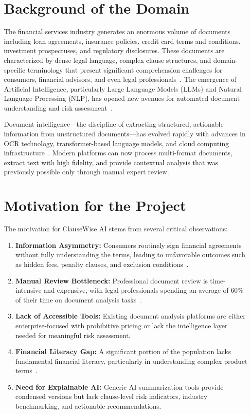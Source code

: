 \documentclass[12pt,a4paper,oneside]{report}
\begin{document}
\section{Background of the Domain}

The financial services industry generates an enormous volume of documents including loan agreements, insurance policies, credit card terms and conditions, investment prospectuses, and regulatory disclosures. These documents are characterized by dense legal language, complex clause structures, and domain-specific terminology that present significant comprehension challenges for consumers, financial advisors, and even legal professionals~\cite{ref1}. The emergence of Artificial Intelligence, particularly Large Language Models (LLMs) and Natural Language Processing (NLP), has opened new avenues for automated document understanding and risk assessment~\cite{ref2}.

Document intelligence---the discipline of extracting structured, actionable information from unstructured documents---has evolved rapidly with advances in OCR technology, transformer-based language models, and cloud computing infrastructure~\cite{ref3}. Modern platforms can now process multi-format documents, extract text with high fidelity, and provide contextual analysis that was previously possible only through manual expert review.

\section{Motivation for the Project}

The motivation for ClauseWise AI stems from several critical observations:

\begin{enumerate}[leftmargin=2cm]
  \item \textbf{Information Asymmetry:} Consumers routinely sign financial agreements without fully understanding the terms, leading to unfavorable outcomes such as hidden fees, penalty clauses, and exclusion conditions~\cite{ref4}.
  \item \textbf{Manual Review Bottleneck:} Professional document review is time-intensive and expensive, with legal professionals spending an average of 60\% of their time on document analysis tasks~\cite{ref5}.
  \item \textbf{Lack of Accessible Tools:} Existing document analysis platforms are either enterprise-focused with prohibitive pricing or lack the intelligence layer needed for meaningful risk assessment.
  \item \textbf{Financial Literacy Gap:} A significant portion of the population lacks fundamental financial literacy, particularly in understanding complex product terms~\cite{ref6}.
  \item \textbf{Need for Explainable AI:} Generic AI summarization tools provide condensed versions but lack clause-level risk indicators, industry benchmarking, and actionable recommendations.
\end{enumerate}
\end{document}
